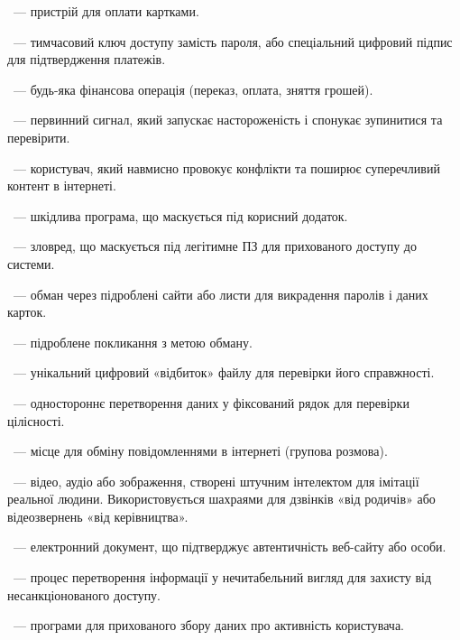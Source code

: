~--- пристрій для оплати картками.

~--- тимчасовий ключ доступу замість пароля, або спеціальний цифровий підпис для підтвердження платежів.

~--- будь-яка фінансова операція (переказ, оплата, зняття грошей).

~--- первинний сигнал, який запускає настороженість і спонукає зупинитися та перевірити.

~--- користувач, який навмисно провокує конфлікти та поширює суперечливий контент в інтернеті.

~--- шкідлива програма, що маскується під корисний додаток.

~--- зловред, що маскується під легітимне ПЗ для прихованого доступу до системи.

~--- обман через підроблені сайти або листи для викрадення паролів і даних карток.

~--- підроблене покликання з метою обману.

~--- унікальний цифровий «відбиток» файлу для перевірки його справжності.

~--- одностороннє перетворення даних у фіксований рядок для перевірки цілісності.

~--- місце для обміну повідомленнями в інтернеті (групова розмова).

\newpage

~--- відео, аудіо або зображення, створені штучним інтелектом для імітації реальної людини. Використовується шахраями для дзвінків «від родичів» або відеозвернень «від керівництва».

~--- електронний документ, що підтверджує автентичність веб-сайту або особи.

~--- процес перетворення інформації у нечитабельний вигляд для захисту від несанкціонованого доступу.

~--- програми для прихованого збору даних про активність користувача.
